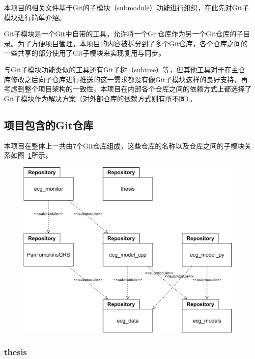 本项目的相关文件基于Git的子模块（submodule）功能进行组织，在此先对Git子模块进行简单介绍。

Git子模块是一个Git中自带的工具，允许将一个Git仓库作为另一个Git仓库的子目录。为了方便项目管理，本项目的内容被拆分到了多个Git仓库，各个仓库之间的一些共享的部分使用了Git子模块来实现复用与同步。

与Git子模块功能类似的工具还有Git子树（subtree）等，但其他工具对于在主仓库修改之后向子仓库进行推送的这一需求都没有像Git子模块这样的良好支持，再考虑到整个项目架构的一致性，本项目在内部各个仓库之间的依赖方式上都选择了Git子模块作为解决方案（对外部仓库的依赖方式则有所不同）。

\subsection{项目包含的Git仓库}\label{subsec:git-repositories}

本项目在整体上一共由7个Git仓库组成，这些仓库的名称以及仓库之间的子模块关系如图~\ref{fig:repositories}所示。

\begin{figure}[ht]
    \includegraphics[width=\textwidth]{../assets/repositories.drawio}
    \label{fig:repositories}
\end{figure}

\subsubsection{thesis}\label{subsubsec:repo-thesis}

